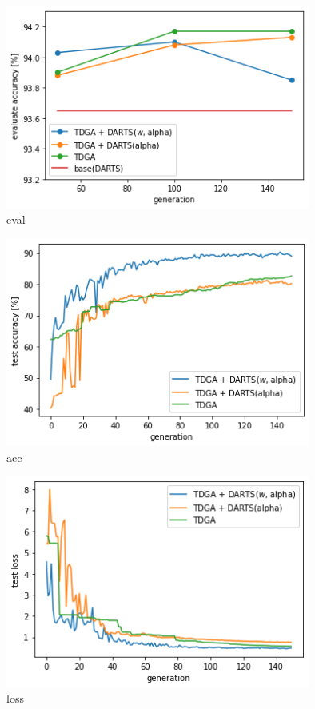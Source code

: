 \begin{figure}[t]
  \begin{center}
    \includegraphics[clip,width=10cm]{./fig/04.exp/eval.png}
  \end{center}
  \caption{eval}
  \label{fig:exp2/eval}
\end{figure}
\begin{figure}[t]
  \begin{center}
    \includegraphics[clip,width=10cm]{./fig/04.exp/acc.png}
  \end{center}
  \caption{acc}
  \label{fig:exp2/acc}
\end{figure}
\begin{figure}[t]
  \begin{center}
    \includegraphics[clip,width=10cm]{./fig/04.exp/loss.png}
  \end{center}
  \caption{loss}
  \label{fig:exp2/loss}
\end{figure}
